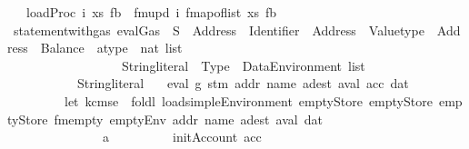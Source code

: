 \begin{isabellebody}
\ \ \ {\isachardoublequoteopen}loadProc\ i\ {\isacharparenleft}{\kern0pt}xs{\isacharcomma}{\kern0pt}\ fb{\isacharparenright}{\kern0pt}\ {\isacharequal}{\kern0pt}\ fmupd\ i\ {\isacharparenleft}{\kern0pt}fmap{\isacharunderscore}{\kern0pt}of{\isacharunderscore}{\kern0pt}list\ xs{\isacharcomma}{\kern0pt}\ fb{\isacharparenright}{\kern0pt}{\isachardoublequoteclose}%
\isadelimdocument
%
\endisadelimdocument
%
\isatagdocument
%
\isamarkuptrue%
%
\endisatagdocument
{\isafolddocument}%
%
\isadelimdocument
%
\endisadelimdocument
{}\isamarkupfalse%
{\isacharparenleft}{\kern0pt}\ statement{\isacharunderscore}{\kern0pt}with{\isacharunderscore}{\kern0pt}gas{\isacharparenright}{\kern0pt}\ eval{\isacharcolon}{\kern0pt}{\isacharcolon}{\kern0pt}{\isachardoublequoteopen}Gas\ {\isasymRightarrow}\ S\ {\isasymRightarrow}\ Address\ {\isasymRightarrow}\ Identifier\ {\isasymRightarrow}\ Address\ {\isasymRightarrow}\ Valuetype\ {\isasymRightarrow}\ {\isacharparenleft}{\kern0pt}Address\ {\isasymtimes}\ Balance\ {\isasymtimes}\ atype\ {\isasymtimes}\ nat{\isacharparenright}{\kern0pt}\ list\ \isanewline
\ \ \ \ \ \ \ \ \ \ \ \ \ \ \ \ \ {\isasymRightarrow}\ {\isacharparenleft}{\kern0pt}String{\isachardot}{\kern0pt}literal\ {\isasymtimes}\ Type\ {\isasymtimes}\ Data\isactrlsub E\isactrlsub n\isactrlsub v\isactrlsub i\isactrlsub r\isactrlsub o\isactrlsub n\isactrlsub m\isactrlsub e\isactrlsub n\isactrlsub t{\isacharparenright}{\kern0pt}\ list\isanewline
\ \ \ \ \ \ \ \ \ \ {\isasymRightarrow}\ String{\isachardot}{\kern0pt}literal{\isachardoublequoteclose}\isanewline
\ \ \ {\isachardoublequoteopen}eval\ g\ stm\ addr\ name\ adest\ aval\ acc\ dat\isanewline
\ \ \ \ \ \ \ \ {\isacharequal}{\kern0pt}\ {\isacharparenleft}{\kern0pt}let\ {\isacharparenleft}{\kern0pt}k{\isacharcomma}{\kern0pt}c{\isacharcomma}{\kern0pt}m{\isacharcomma}{\kern0pt}s{\isacharcomma}{\kern0pt}e{\isacharparenright}{\kern0pt}\ {\isacharequal}{\kern0pt}\ foldl\ loadsimple\isactrlsub E\isactrlsub n\isactrlsub v\isactrlsub i\isactrlsub r\isactrlsub o\isactrlsub n\isactrlsub m\isactrlsub e\isactrlsub n\isactrlsub t\ {\isacharparenleft}{\kern0pt}emptyStore{\isacharcomma}{\kern0pt}\ emptyStore{\isacharcomma}{\kern0pt}\ emptyStore{\isacharcomma}{\kern0pt}\ fmempty{\isacharcomma}{\kern0pt}\ emptyEnv\ addr\ name\ adest\ aval{\isacharparenright}{\kern0pt}\ dat{\isacharsemicolon}{\kern0pt}\isanewline
\ \ \ \ \ \ \ \ \ \ \ \ \ \ \ a\ \ \ \ \ \ \ \ \ {\isacharequal}{\kern0pt}\ init\isactrlsub A\isactrlsub c\isactrlsub c\isactrlsub o\isactrlsub u\isactrlsub n\isactrlsub t\ acc{\isacharsemicolon}{\kern0pt}\isanewline

\end{isabellebody}
